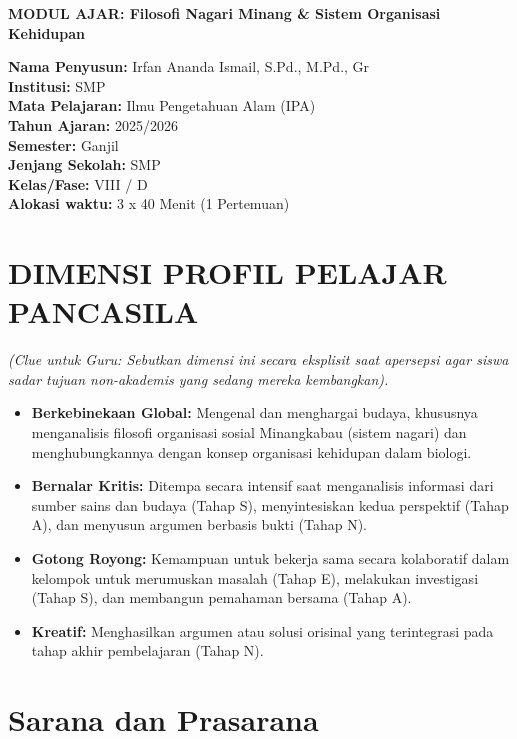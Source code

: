 \documentclass[a4paper,12pt]{article}
\begin{document}
\begin{center}
{\Large\textbf{MODUL AJAR: Filosofi Nagari Minang \& Sistem Organisasi Kehidupan}}
\end{center}

\vspace{0.5cm}

\begin{tcolorbox}[mainbox]
\textbf{Nama Penyusun:} Irfan Ananda Ismail, S.Pd., M.Pd., Gr \\
\textbf{Institusi:} SMP \\
\textbf{Mata Pelajaran:} Ilmu Pengetahuan Alam (IPA) \\
\textbf{Tahun Ajaran:} 2025/2026 \\
\textbf{Semester:} Ganjil \\
\textbf{Jenjang Sekolah:} SMP \\
\textbf{Kelas/Fase:} VIII / D \\
\textbf{Alokasi waktu:} 3 x 40 Menit (1 Pertemuan)
\end{tcolorbox}

\section{DIMENSI PROFIL PELAJAR PANCASILA}
\textit{(Clue untuk Guru: Sebutkan dimensi ini secara eksplisit saat apersepsi agar siswa sadar tujuan non-akademis yang sedang mereka kembangkan).}

\begin{itemize}
\item \textbf{Berkebinekaan Global:} Mengenal dan menghargai budaya, khususnya menganalisis filosofi organisasi sosial Minangkabau (sistem nagari) dan menghubungkannya dengan konsep organisasi kehidupan dalam biologi.
\item \textbf{Bernalar Kritis:} Ditempa secara intensif saat menganalisis informasi dari sumber sains dan budaya (Tahap S), menyintesiskan kedua perspektif (Tahap A), dan menyusun argumen berbasis bukti (Tahap N).
\item \textbf{Gotong Royong:} Kemampuan untuk bekerja sama secara kolaboratif dalam kelompok untuk merumuskan masalah (Tahap E), melakukan investigasi (Tahap S), dan membangun pemahaman bersama (Tahap A).
\item \textbf{Kreatif:} Menghasilkan argumen atau solusi orisinal yang terintegrasi pada tahap akhir pembelajaran (Tahap N).
\end{itemize}

\section{Sarana dan Prasarana}
\end{document}
